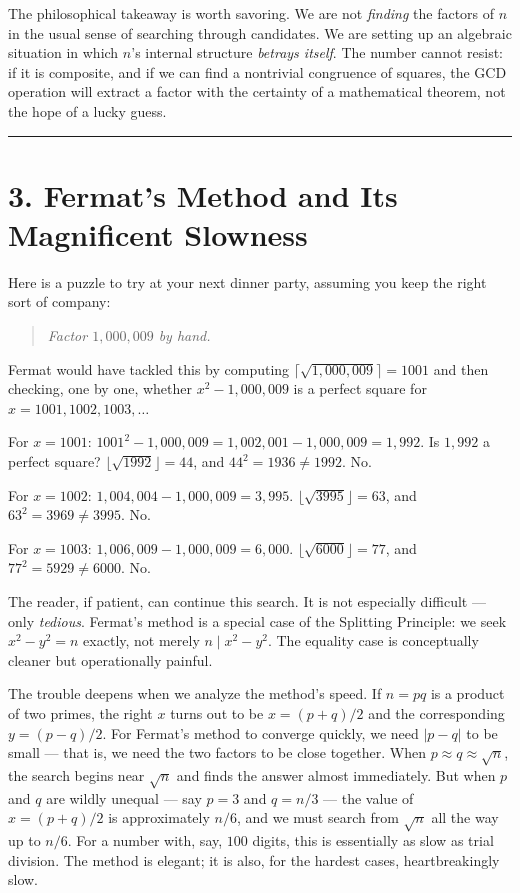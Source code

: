 The philosophical takeaway is worth savoring. We are not \emph{finding} the factors of \(n\) in the usual sense of searching through candidates. We are setting up an algebraic situation in which \(n\)'s internal structure \emph{betrays itself}. The number cannot resist: if it is composite, and if we can find a nontrivial congruence of squares, the GCD operation will extract a factor with the certainty of a mathematical theorem, not the hope of a lucky guess.

\bigskip\noindent\rule{\linewidth}{0.4pt}\bigskip

\section{3. Fermat's Method and Its Magnificent Slowness}
Here is a puzzle to try at your next dinner party, assuming you keep the right sort of company:

\begin{quote}
\emph{Factor \(1{,}000{,}009\) by hand.}
\end{quote}

Fermat would have tackled this by computing \(\lceil \sqrt{1{,}000{,}009} \rceil = 1001\) and then checking, one by one, whether \(x^2 - 1{,}000{,}009\) is a perfect square for \(x = 1001, 1002, 1003, \ldots\)

For \(x = 1001\): \(1001^2 - 1{,}000{,}009 = 1{,}002{,}001 - 1{,}000{,}009 = 1{,}992\). Is \(1{,}992\) a perfect square? \(\lfloor \sqrt{1992} \rfloor = 44\), and \(44^2 = 1936 \neq 1992\). No.

For \(x = 1002\): \(1{,}004{,}004 - 1{,}000{,}009 = 3{,}995\). \(\lfloor \sqrt{3995} \rfloor = 63\), and \(63^2 = 3969 \neq 3995\). No.

For \(x = 1003\): \(1{,}006{,}009 - 1{,}000{,}009 = 6{,}000\). \(\lfloor \sqrt{6000} \rfloor = 77\), and \(77^2 = 5929 \neq 6000\). No.

The reader, if patient, can continue this search. It is not especially difficult --- only \emph{tedious}. Fermat's method is a special case of the Splitting Principle: we seek \(x^2 - y^2 = n\) exactly, not merely \(n \mid x^2 - y^2\). The equality case is conceptually cleaner but operationally painful.

The trouble deepens when we analyze the method's speed. If \(n = pq\) is a product of two primes, the right \(x\) turns out to be \(x = (p + q)/2\) and the corresponding \(y = (p - q)/2\). For Fermat's method to converge quickly, we need \(|p - q|\) to be small --- that is, we need the two factors to be close together. When \(p \approx q \approx \sqrt{n}\), the search begins near \(\sqrt{n}\) and finds the answer almost immediately. But when \(p\) and \(q\) are wildly unequal --- say \(p = 3\) and \(q = n/3\) --- the value of \(x = (p + q)/2\) is approximately \(n/6\), and we must search from \(\sqrt{n}\) all the way up to \(n/6\). For a number with, say, \(100\) digits, this is essentially as slow as trial division. The method is elegant; it is also, for the hardest cases, heartbreakingly slow.


